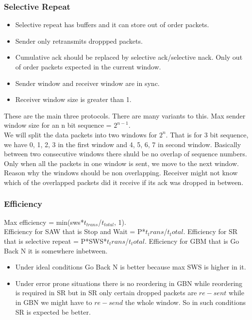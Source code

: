 \documentclass[solution,addpoints,12pt]{exam}
\begin{document}
\subsubsection{Selective Repeat}
\begin{itemize}
\item Selective repeat has buffers and it can store out of order
packets.
\item Sender only retransmits droppped packets.
\item Cumulative ack should be replaced by selective ack/selective nack.
Only out of order packets expected in the current window.
\item Sender window and receiver window are in sync.
\item Receiver window size is greater than 1.
\end{itemize}
These are the main three protocols. There are many variants to this.
Max sender window size for an n bit sequence = $2^{n-1}$.\\
We will split the data packets into two windows for $2^n$. That is for 3
bit sequence, we have 0, 1, 2, 3 in the first window and 4, 5, 6, 7 in
second window. Basically between two consecutive windows there shuld be no
overlap of sequence numbers. Only when all the
packets in one window is sent, we move to the next window.
Reason why the windows should be non overlapping. Receiver
might not know which of the overlapped packets did it receive if its
ack was dropped in between.\\

\subsubsection{Efficiency}
Max efficiency = min(sws*$t_{trans}$/$t_{total}$, 1).\\
Efficiency for SAW that is Stop and Wait = P*$t_trans$/$t_total$.
Efficiency for SR that is selective repeat = P*SWS*$t_trans$/$t_total$.
Efficiency for GBM that is Go Back N it is somewhere inbetween.
\begin{itemize}
\item Under ideal conditions Go Back N is better because max SWS is higher in
it.
\item Under error prone situations there is no reordering
in GBN while reordering is required in SR but in SR only certain
dropped packets are $re-sent$ while in GBN we might have to $re-send$ the
whole window. So in such conditions SR is expected be better.
\end{itemize}
\end{document}
